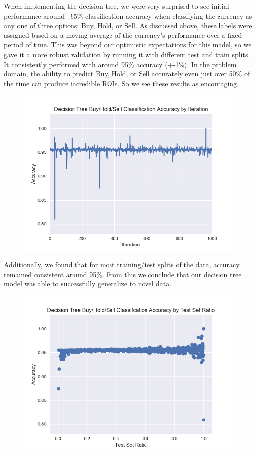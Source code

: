 \documentclass{article}
\begin{document}
When implementing the decision tree, we were very surprised to see initial performance around ~95\% classification accuracy when classifying the currency as any one of three options: Buy, Hold, or Sell. As discussed above, these labels were assigned based on a moving average of the currency's performance over a fixed period of time. This was beyond our optimistic expectations for this model, so we gave it a more robust validation by running it with different test and train splits. It consistently performed with around 95\% accuracy (+-1\%). In the problem domain, the ability to predict Buy, Hold, or Sell accurately even just over 50\% of the time can produce incredible ROIs. So we see these results as encouraging. \\

\begin{figure}[H]
	\includegraphics[scale=0.55 ]{../pic/iteration.png}
\end{figure}

Additionally, we found that for most training/test splits of the data, accuracy remained consistent around 95\%. From this we conclude that our decision tree model was able to successfully generalize to novel data.

\begin{figure}[H]
	\includegraphics[scale=0.55 ]{../pic/ration.png}
\end{figure}
\end{document}
